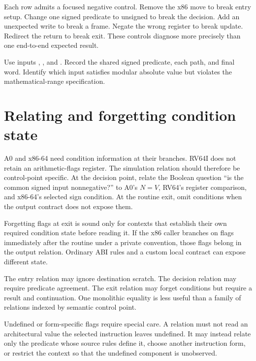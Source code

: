 Each row admits a focused negative control. Remove the x86 move to break entry
setup. Change one signed predicate to unsigned to break the decision. Add an
unexpected write to break a frame. Negate the wrong register to break update.
Redirect the return to break exit. These controls diagnose more precisely than
one end-to-end expected result.

\begin{tryit}[title={Trace both paths at width four}]
Use inputs , , and . Record the shared signed
predicate, each path, and final word. Identify which input satisfies modular
absolute value but violates the mathematical-range specification.
\end{tryit}

\section{Relating and forgetting condition state}

A0 and x86-64 need condition information at their branches. RV64I does not
retain an arithmetic-flags register. The simulation relation should therefore
be control-point specific. At the decision point, relate the Boolean question
``is the common signed input nonnegative?'' to A0's \(N=V\), RV64's register
comparison, and x86-64's selected sign condition. At the routine exit, omit
conditions when the output contract does not expose them.

Forgetting flags at exit is sound only for contexts that establish their own
required condition state before reading it. If the x86 caller branches on
flags immediately after the routine under a private convention, those flags
belong in the output relation. Ordinary ABI rules and a custom local contract
can expose different state.

\begin{sidebar}[title={Abstraction can change across control points}]
The entry relation may ignore destination scratch. The decision relation may
require predicate agreement. The exit relation may forget conditions but
require a result and continuation. One monolithic equality is less useful than
a family of relations indexed by semantic control point.
\end{sidebar}

Undefined or form-specific flags require special care. A relation must not
read an architectural value the selected instruction leaves undefined. It may
instead relate only the predicate whose source rules define it, choose another
instruction form, or restrict the context so that the undefined component is
unobserved.

